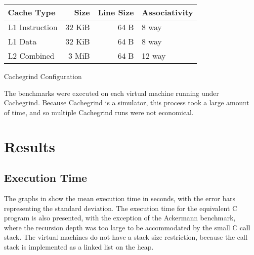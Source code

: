 		\begin{myfigure}
			\begin{tabular}{|l|r|r|l|}
				\hline
				Cache Type & Size & Line Size & Associativity \\
				\hline
				L1 Instruction & 32 KiB & 64 B & 8 way \\
				\hline
				L1 Data & 32 KiB & 64 B & 8 way \\
				\hline
				L2 Combined & 3 MiB & 64 B & 12 way \\
				\hline
			\end{tabular}
			
			\caption{Cachegrind Configuration}
			\label{fig:cacheconfig}
		\end{myfigure}
		
		The benchmarks were executed on each virtual machine running under Cachegrind. Because Cachegrind is a simulator, this process took a large amount of time, and so multiple Cachegrind runs were not economical. 
		
	\section{Results}
		\subsection{Execution Time}
		The graphs in  show the mean execution time in seconds, with the error bars representing the standard deviation. The execution time for the equivalent C program is also presented, with the exception of the Ackermann benchmark, where the recursion depth was too large to be accommodated by the small C call stack. The virtual machines do not have a stack size restriction, because the call stack is implemented as a linked list on the heap.
	
